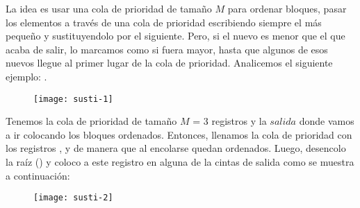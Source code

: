 \documentclass[10pt,a4paper]{article}
\begin{document}
La idea es usar una cola de prioridad de tamaño $M$ para ordenar bloques, pasar los elementos a través de una cola de prioridad escribiendo siempre el más pequeño y sustituyendolo por el siguiente. Pero, si el nuevo es menor que el que acaba de salir, lo marcamos como si fuera mayor, hasta que algunos de esos nuevos llegue al primer lugar de la cola de prioridad.
\newline
\newline
Analicemos el siguiente ejemplo: . 
\newline
\newline
\begin{figure}[h]
	\centering
\texttt{[image: susti-1]}
	\label{drivers1}
\end{figure}
\newline
\newline
Tenemos la cola de prioridad de tamaño $M$ = 3 registros y la $salida$ donde vamos a ir colocando los bloques ordenados. Entonces, llenamos la cola de prioridad con los registros ,  y  de manera que al encolarse quedan ordenados.
\newline
\newline
Luego, desencolo la raíz () y coloco a este registro en alguna de la cintas de salida como se muestra a continuación:
\newline
\newline
\begin{figure}[h]
	\centering
\texttt{[image: susti-2]}
	\label{drivers1}
\end{figure}
\newpage
\end{document}
